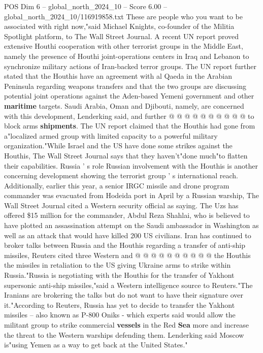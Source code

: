 \begin{textsample}{POS Dim 6 – global\_north\_2024\_10 – Score 6.00 – global\_north\_2024\_10/116919858.txt}
These are people who you want to be associated with right now,"said Michael Knights, co-founder of the Militia Spotlight platform, to The Wall Street Journal.
A recent UN report proved extensive Houthi cooperation with other terrorist groups in the Middle East, namely the presence of Houthi joint-operations centers in Iraq and Lebanon to synchronize military actions of Iran-backed terror groups.
The UN report further stated that the Houthis have an agreement with al Qaeda in the Arabian Peninsula regarding weapons transfers and that the two groups are discussing potential joint operations against the Aden-based Yemeni government and other \textbf{maritime} targets.
Saudi Arabia, Oman and Djibouti, namely, are concerned with this development, Lenderking said, and further @ @ @ @ @ @ @ @ @ @ to block arms \textbf{shipments}.
The UN report claimed that the Houthis had gone from a"localized armed group with limited capacity to a powerful military organization."While Israel and the US have done some strikes against the Houthis, The Wall Street Journal says that they haven't"done much"to flatten their capabilities.
Russia ' s role Russian involvement with the Houthis is another concerning development showing the terrorist group ' s international reach.
Additionally, earlier this year, a senior IRGC missile and drone program commander was evacuated from Hodeida port in April by a Russian warship, The Wall Street Journal cited a Western security official as saying.
The Uzs has offered \$15 million for the commander, Abdul Reza Shahlai, who is believed to have plotted an assassination attempt on the Saudi ambassador in Washington as well as an attack that would have killed 200 US civilians.
Iran has continued to broker talks between Russia and the Houthis regarding a transfer of anti-ship missiles, Reuters cited three Western and @ @ @ @ @ @ @ @ @ @ the Houthis the missiles in retaliation to the US giving Ukraine arms to strike within Russia."Russia is negotiating with the Houthis for the transfer of Yakhont supersonic anti-ship missiles,"said a Western intelligence source to Reuters."The Iranians are brokering the talks but do not want to have their signature over it."According to Reuters, Russia has yet to decide to transfer the Yakhont missiles -- also known as P-800 Oniks - which experts said would allow the militant group to strike commercial \textbf{vessels} in the Red \textbf{Sea} more and increase the threat to the Western warships defending them.
Lenderking said Moscow is"using Yemen as a way to get back at the United States."

\end{textsample}
